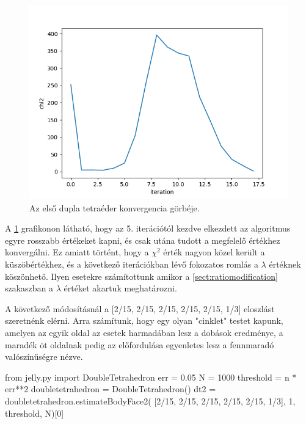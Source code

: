 \begin{figure}[h!]
	\centering
	\includegraphics[scale=0.7]{images/doubletetrahedron_01.png}
	\caption{Az első dupla tetraéder konvergencia görbéje.}
	\label{fig:doubletetra01}
\end{figure}

A \ref{fig:doubletetra01} grafikonon látható, hogy az 5. iterációtól kezdve elkezdett az algoritmus egyre rosszabb értékeket kapni, és csak utána tudott a megfelelő értékhez konvergálni.
Ez amiatt történt, hogy a $\chi^2$ érték nagyon közel került a küszöbértékhez, és a következő iterációkban lévő fokozatos romlás a $\lambda$ értéknek köszönhető.
Ilyen esetekre számítottunk amikor a \ref{sect:ratiomodification} szakaszban a $\lambda$ értéket akartuk meghatározni.

A következő módosításnál a [2/15, 2/15, 2/15, 2/15, 2/15, 1/3] eloszlást szeretnénk elérni.
Arra számítunk, hogy egy olyan "cinklet" testet kapunk, amelyen az egyik oldal az esetek harmadában lesz a dobások eredménye, a maradék öt oldalnak pedig az előfordulása egyenletes lesz a fennmaradó valószínűségre nézve.

\begin{python}
from jelly.py import DoubleTetrahedron
err = 0.05
N = 1000
threshold = n * err**2
doubletetrahedron = DoubleTetrahedron()
dt2 = doubletetrahedron.estimateBodyFace2(
      [2/15, 2/15, 2/15, 2/15, 2/15, 1/3],
      1, threshold, N)[0]
\end{python}

